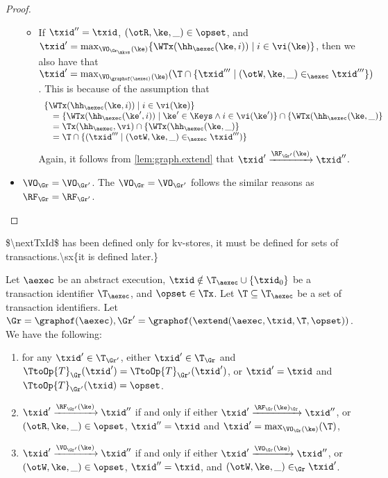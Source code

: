 \begin{proof}
\begin{itemize}
\begin{itemize}
\item If $\txid'' = \txid$, $(\otR, \ke, \_) \in \opset$, and $\txid' = \max_{\VO_{\Gr_\mkvs}(\ke)} \{ \WTx(\hh_{\aexec}(\ke, i)) \mid i \in \vi(\ke)\}$, 
then we also have that $\txid' = \max_{\VO_{\graphof(\aexec)}(\ke)} (\T \cap \{ \txid''' \mid (\otW, \ke, \_) \in_{\aexec} \txid'''\}) $. 
This is because of the assumption that 
\[
\begin{array}{l}
\{\WTx(\hh_{\aexec}(\ke, i)) \mid i \in \vi(\ke)\}  \\
\quad = \{\WTx(\hh_{\aexec}(\ke', i)) \mid \ke' \in \Keys \wedge i \in \vi(\ke')\} \cap \{\WTx(\hh_{\aexec}(\ke, \_)\} \\
\quad = \Tx(\hh_{\aexec}, \vi) \cap \{\WTx(\hh_{\aexec}(\ke, \_)\}  \\
\quad = \T \cap \{(\txid''' \mid (\otW, \ke, \_) \in_{\aexec} \txid''')\}
\end{array}
\]
Again, it follows from \cref{lem:graph.extend} that $\txid' \xrightarrow{\RF_{\Gr'}(\ke)} \txid''$. 
\end{itemize}
\item \( \VO_{\Gr} = \VO_{\Gr'}\). The \( \VO_{\Gr} = \VO_{\Gr'} \) follows the similar reasons as $\RF_{\Gr} = \RF_{\Gr'}$.
\end{itemize}
\end{proof}

\ac{$\nextTxId$ has been defined only for kv-stores, it must be defined for sets of transactions.\sx{it is defined later.}}
\begin{lemma}
\label{lem:graph.extend}
Let $\aexec$ be an abstract execution, 
$\txid \notin \T_{\aexec} \cup \{\txid_0\}$ be a transaction identifier $\T_{\aexec}$, and $\opset \in \Tx$. 
Let $\T \subseteq \T_{\aexec}$ be a set of transaction identifiers.
Let $\Gr = \graphof(\aexec), \Gr' = \graphof(\extend(\aexec, \txid, \T, \opset))$. 
We have the following: 
\begin{enumerate}
\item for any $\txid' \in \T_{\Gr'}$, either $\txid' \in \T_{\Gr}$ and $\TtoOp{T}_{\Gr}(\txid') = \TtoOp{T}_{\Gr'}(\txid')$, 
or $\txid' = \txid$ and $\TtoOp{T}_{\Gr'}(\txid) = \opset$.
\item $\txid' \xrightarrow{\RF_{\Gr'}(\ke)} \txid''$ if and only if either 
$\txid' \xrightarrow{\RF_{\Gr}(\ke)_{\Gr}} \txid''$, or $(\otR, \ke, \_) \in \opset$, $\txid'' = \txid$ and 
$\txid' = \max_{\VO_{\Gr}(\ke)}(\T)$, 
\item $\txid' \xrightarrow{\VO_{\Gr'}(\ke)} \txid''$ if and only if 
either $\txid' \xrightarrow{\VO_{\Gr}(\ke)} \txid''$, or $(\otW, \ke, \_) \in \opset$, $\txid'' = \txid$, 
and $(\otW, \ke, \_) \in_{\Gr} \txid'$.
\end{enumerate}
\end{lemma}

